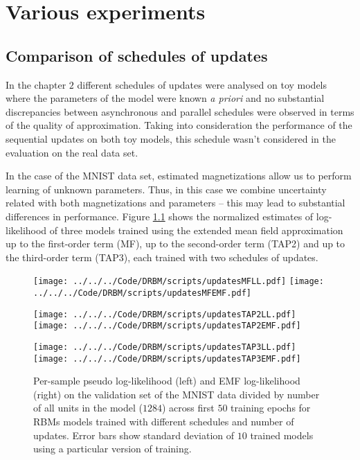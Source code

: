 \chapter{Various experiments}

\section{Comparison of schedules of updates}
In the chapter $2$ different schedules of updates were analysed on toy models where the parameters of the model were known \emph{a priori} and no substantial discrepancies between asynchronous and parallel schedules were observed in terms of the quality of approximation. Taking into consideration the performance of the sequential updates on both toy models, this schedule wasn't considered in the evaluation on the real data set.

In the case of the MNIST data set, estimated magnetizations allow us to perform learning of unknown parameters. Thus, in this case we combine uncertainty related with both magnetizations and parameters -- this may lead to substantial differences in performance. Figure \ref{fig:updatesLL} shows the normalized estimates of log-likelihood of three models trained using the extended mean field approximation up to the first-order term (MF), up to the second-order term (TAP2) and up to the third-order term (TAP3), each trained with two schedules of updates.

\begin{figure}[!htb]
%
\texttt{[image: ../../../Code/DRBM/scripts/updatesMFLL.pdf]}
\endminipage 
{}  
 \texttt{[image: ../../../Code/DRBM/scripts/updatesMFEMF.pdf]}
\endminipage\hfill

%
 \texttt{[image: ../../../Code/DRBM/scripts/updatesTAP2LL.pdf]}
\endminipage 
{}  
\texttt{[image: ../../../Code/DRBM/scripts/updatesTAP2EMF.pdf]}
\endminipage\hfill

%
\texttt{[image: ../../../Code/DRBM/scripts/updatesTAP3LL.pdf]}
\endminipage 
{}  
\texttt{[image: ../../../Code/DRBM/scripts/updatesTAP3EMF.pdf]}
\endminipage\hfill
  \caption[Estimates of log-likelihood with different updates]{Per-sample pseudo log-likelihood (left) and EMF log-likelihood (right) on the validation set of the MNIST data divided by number of all units in the model ($1284$) across first $50$ training epochs for RBMs models trained with different schedules and number of updates. Error bars show standard deviation of $10$ trained models using a particular version of training.}
  \label{fig:updatesLL}
\end{figure}

